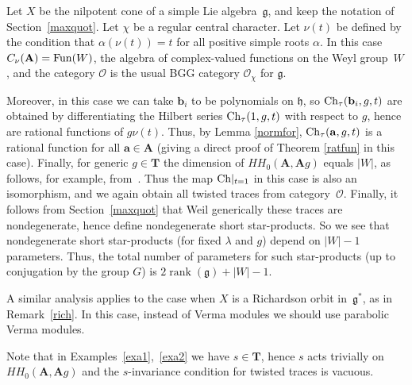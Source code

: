 \documentclass[pdftex]{sigma}
\numberwithin{equation}{section}
\newcommand{\g}{\mathfrak{g}}
\newcommand{\h}{\mathfrak{h}}
\begin{document}
\begin{Example}\label{exa2} Let $X$ be the nilpotent cone of a simple Lie algebra~$\g$, and keep the notation of Section~\ref{maxquot}. Let $\chi$ be a regular central character.
Let $\nu(t)$ be defined by the condition that $\alpha(\nu(t))=t$ for all positive simple roots $\alpha$.
In this case $C_\nu({\mathbf A})={\rm Fun}(W)$,
the algebra of complex-valued functions on the Weyl group~$W$,  and the category $\mathcal{O}$ is the usual
BGG category $\mathcal{O}_\chi$ for $\g$.

Moreover, in this case we can take ${\mathbf b}_i$ to be polynomials on
$\h$, so ${\rm Ch}_\tau({\mathbf b}_i,g,t)$ are obtained by differentiating
the Hilbert series ${\rm Ch}_\tau(1,g,t)$ with respect to $g$, hence are rational functions of $g\nu(t)$. Thus, by
Lemma \ref{normfor}, ${\rm Ch}_\tau({\mathbf a},g,t)$ is a rational function for all ${\mathbf a}\in {\mathbf A}$ (giving a direct proof of Theorem \ref{ratfun} in this case). Finally, for generic $g\in {\mathbf T}$ the dimension of $HH_0({\mathbf A},{\mathbf A} g)$ equals $|W|$, as follows, for example, from~\cite{So}. Thus the map ${\rm Ch}|_{t=1}$ in this case is also an isomorphism, and we again obtain all twisted traces from category~$\mathcal{O}$. Finally, it follows from Section~\ref{maxquot} that Weil generically these traces are nondegenerate, hence define nondegenerate short star-products. So we see that nondegenerate short star-products (for fixed $\lambda$ and $g$) depend on $|W|-1$ parameters. Thus, the total number of parameters for such star-products (up to conjugation by the group $G$) is $2\operatorname{rank}(\g)+|W|-1$.

A similar analysis applies to the case when $X$ is a Richardson orbit in~$\g^*$, as in Remark~\ref{rich}. In this case, instead of Verma modules we should use parabolic Verma modules.
\end{Example}

\begin{Remark} Note that in Examples~\ref{exa1},~\ref{exa2} we have $s\in{\mathbf T}$, hence $s$ acts trivially on $HH_0({\mathbf A},{\mathbf A} g)$ and the $s$-invariance condition for twisted traces is vacuous.
\end{Remark}
\end{document}
